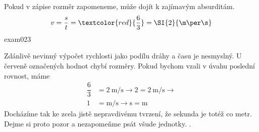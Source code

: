 \begin{fyzexam}{Pokud v zápise rozměr zapomeneme, může dojít k zajímavým absurditám.
  \[v = \dfrac{s}{t} = \textcolor{red}{\dfrac{6}{3}} = \SI{2}{\m\per\s}\]}{exam023}    

  Zdánlivě nevinný výpočet rychlosti jako podílu dráhy a času je nesmyslný. U červeně označených
  hodnot chybí rozměry. Pokud bychom vzali v úvahu poslední rovnost, máme
  \begin{align*}
    \dfrac{6}{3} &= \SI{2}{\m\per\s}  \rightarrow 2 = \SI{2}{\m\per\s}  \rightarrow \\
               1 &= \si{\m\per\s}     \rightarrow     \si{\s} = \si{\m} 
  \end{align*}
  Docházíme tak ke zcela jistě nepravdivému tvrzení, že sekunda je totéž co metr. Dejme si proto
  pozor a nezapomeňme psát všude jednotky. \cite[s.~1]{Kulhanek2020}. 
\end{fyzexam}
